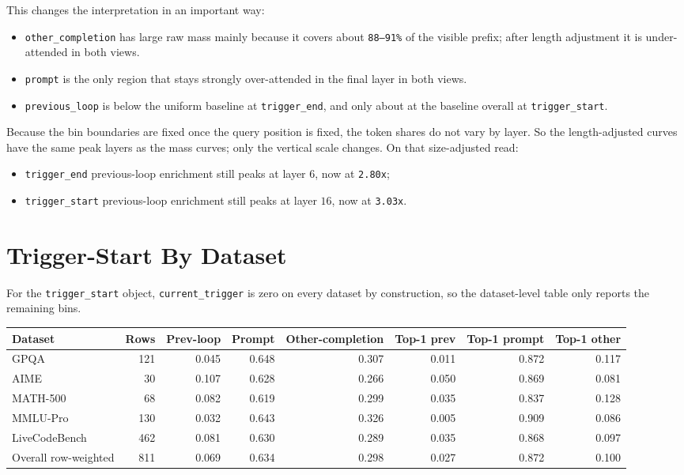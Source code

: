\documentclass[11pt]{article}
\begin{document}
This changes the interpretation in an important way:

\begin{itemize}
  \item \texttt{other\_completion} has large raw mass mainly because it covers about \texttt{88--91\%} of the visible prefix; after length adjustment it is under-attended in both views.
  \item \texttt{prompt} is the only region that stays strongly over-attended in the final layer in both views.
  \item \texttt{previous\_loop} is below the uniform baseline at \texttt{trigger\_end}, and only about at the baseline overall at \texttt{trigger\_start}.
\end{itemize}

Because the bin boundaries are fixed once the query position is fixed, the token shares do not vary by layer. So the length-adjusted curves have the same peak layers as the mass curves; only the vertical scale changes. On that size-adjusted read:

\begin{itemize}
  \item \texttt{trigger\_end} previous-loop enrichment still peaks at layer $6$, now at \texttt{2.80x};
  \item \texttt{trigger\_start} previous-loop enrichment still peaks at layer $16$, now at \texttt{3.03x}.
\end{itemize}

\section*{Trigger-Start By Dataset}

For the \texttt{trigger\_start} object, \texttt{current\_trigger} is zero on every dataset by construction, so the dataset-level table only reports the remaining bins.

\begin{center}
\scriptsize
\begin{tabular}{lrrrrrrr}
\toprule
Dataset & Rows & Prev-loop & Prompt & Other-completion & Top-1 prev & Top-1 prompt & Top-1 other \\
\midrule
GPQA & 121 & 0.045 & 0.648 & 0.307 & 0.011 & 0.872 & 0.117 \\
AIME & 30 & 0.107 & 0.628 & 0.266 & 0.050 & 0.869 & 0.081 \\
MATH-500 & 68 & 0.082 & 0.619 & 0.299 & 0.035 & 0.837 & 0.128 \\
MMLU-Pro & 130 & 0.032 & 0.643 & 0.326 & 0.005 & 0.909 & 0.086 \\
LiveCodeBench & 462 & 0.081 & 0.630 & 0.289 & 0.035 & 0.868 & 0.097 \\
\midrule
Overall row-weighted & 811 & 0.069 & 0.634 & 0.298 & 0.027 & 0.872 & 0.100 \\
\bottomrule
\end{tabular}
\normalsize
\end{center}
\end{document}
